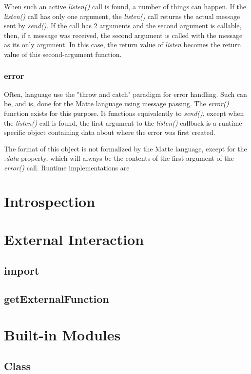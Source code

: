\documentclass[12pt,letterpaper]{report}
\begin{document}
When such an active \textit{listen()} call is found, a number of things can happen.
If the \textit{listen()} call has only one argument, the \textit{listen()} call returns 
the actual message sent by \textit{send()}. If the call has 2 arguments and the second 
argument is callable, then, if a message was received, the second argument is called 
with the message as its only argument. In this case, the return value of \textit{listen} 
becomes the return value of this second-argument function.



\subsection{error}\label{error}

Often, language use the "throw and catch" paradigm for error handling. Such can be, and is, done 
for the Matte language using message passing. The \textit{error()} function exists for this purpose. It functions 
equivalently to \textit{send()}, except when the \textit{listen()} call is found, the first argument 
to the \textit{listen()} callback is a runtime-specific object containing data about where the error 
was first created. 

The format of this object is not formalized by the Matte language, except for the 
\textit{.data} property, which will always be the contents of the first argument 
of the \textit{error()} call. Runtime implementations are 

\chapter{Introspection}\label{Introspection}
\chapter{External Interaction}\label{External Interaction}
\section{import}\label{import}
\section{getExternalFunction}\label{getExternalFunction}
\chapter{Built-in Modules}\label{Built-in Modules}
\section{Class}\label{Class}
\end{document}
